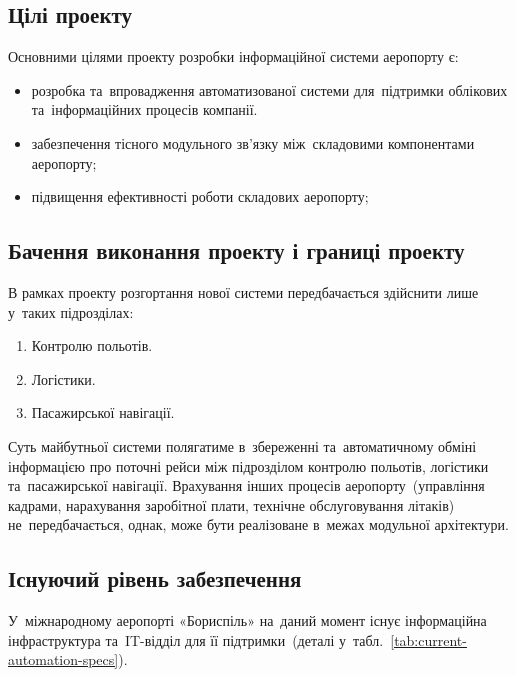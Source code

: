 \documentclass[
	a4paper,
	oneside,
	DIV = 12,
	12pt,
	headings = normal,
]{scrartcl}
\newcommand{\allcaps}[1]{{\addfontfeatures{LetterSpace = 5, Kerning = Off}#1}}
\begin{document}
		\subsection{Цілі проекту}
			Основними цілями проекту розробки інформаційної системи аеропорту є:
			\begin{itemize}
				\item розробка та~впровадження автоматизованої системи для~підтримки облікових та~інформаційних процесів компанії.
				\item забезпечення тісного модульного зв'язку між~складовими компонентами аеропорту;
				\item підвищення ефективності роботи складових аеропорту;
			\end{itemize}

		\subsection{Бачення виконання проекту і границі проекту}
			В рамках проекту розгортання нової системи передбачається здійснити лише у~таких підрозділах:
			\begin{enumerate}
				\item Контролю польотів.
				\item Логістики.
				\item Пасажирської навігації.
			\end{enumerate}
			Суть майбутньої системи полягатиме в~збереженні та~автоматичному обміні інформацією про поточні рейси між підрозділом контролю польотів, логістики та~пасажирської навігації. Врахування інших процесів аеропорту~(управління кадрами, нарахування заробітної плати, технічне обслуговування літаків) не~передбачається, однак, може бути реалізоване в~межах модульної архітектури.

			\subsection{Існуючий рівень забезпечення}
				У~міжнародному аеропорті «Бориспіль» на~даний момент існує інформаційна інфраструктура та~\allcaps{IT}-відділ для її підтримки~(деталі у~табл.~{\ref{tab:current-automation-specs}}).
\end{document}
